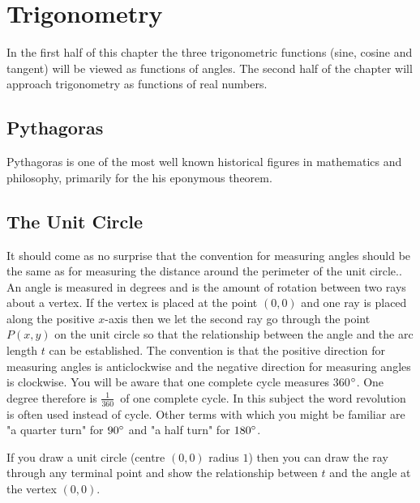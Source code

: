 \chapter{Trigonometry}

In the first half of this chapter the three trigonometric functions (sine, cosine and tangent) will be viewed as functions of angles. The second half of the chapter will approach trigonometry as functions of real numbers.
\section{Pythagoras}
Pythagoras is one of the most well known historical figures in mathematics and philosophy, primarily for the his eponymous theorem.

\section{The Unit Circle}
It should come as no surprise that the convention for measuring angles should be the same as for measuring
the distance around the perimeter of the unit circle.. An angle is measured in degrees and is the amount of
rotation between two rays about a vertex. If the vertex is placed at the point $\left (0 ,0\right )$ and one ray is placed along the positive $x$-axis then we let the second ray go through the point $P (x ,y)$ on the unit circle so that the relationship between the angle and the arc length $t$ can be established. The convention is that the positive direction for measuring
angles is anticlockwise and the negative direction for measuring angles is clockwise. You will be aware that one complete cycle measures 360$\mbox{{\ensuremath{{}^\circ}}}$. One degree therefore is $\frac{1}{360}$\ of one complete cycle. In this subject the word revolution is often used instead of cycle. Other terms with which you might be familiar are "a quarter turn" for $90 \mbox{{\ensuremath{{}^\circ}}}$ and "a half turn" for $180 \mbox{{\ensuremath{{}^\circ}}}$. 

If you draw a unit circle (centre $\left (0 ,0\right )$ radius $1$) then you can draw the ray through any terminal point and show the relationship between $t$ and the angle at the vertex $\left (0 ,0\right )$. 

